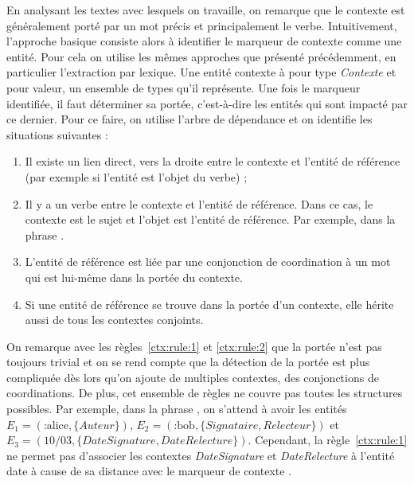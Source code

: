 En analysant les textes avec lesquels on travaille, on remarque que le contexte est généralement porté par un mot précis et principalement le verbe.
Intuitivement, l'approche basique consiste alors à identifier le marqueur de contexte comme une entité.
Pour cela on utilise les mêmes approches que présenté précédemment, en particulier l'extraction par lexique.
Une entité contexte à pour type \emph{Contexte} et pour valeur, un ensemble de types qu'il représente.
Une fois le marqueur identifiée, il faut déterminer sa portée, c'est-à-dire les entités qui sont impacté par ce dernier.
Pour ce faire, on utilise l'arbre de dépendance et on identifie les situations suivantes :
\begin{enumerate}
    \item Il existe un lien direct, vers la droite entre le contexte et l'entité de référence (par exemple si l'entité est l'objet du verbe) ;

    \item Il y a un verbe entre le contexte et l'entité de référence.
          Dans ce cas, le contexte est le sujet et l'objet est l'entité de référence.
          Par exemple, dans la phrase .

    \item L'entité de référence est liée par une conjonction de coordination à un mot qui est lui-même dans la portée du contexte. \label{ctx:rule:1}

    \item Si une entité de référence se trouve dans la portée d'un contexte, elle hérite aussi de tous les contextes conjoints. \label{ctx:rule:2}
\end{enumerate}

On remarque avec les règles~\ref{ctx:rule:1} et \ref{ctx:rule:2} que la portée n'est pas toujours trivial et on se rend compte que la détection de la portée est plus compliquée dès lors qu'on ajoute de multiples contextes, des conjonctions de coordinations.
De plus, cet ensemble de règles ne couvre pas toutes les structures possibles.
Par exemple, dans la phrase , on s'attend à avoir les entités $E_1 = (\text{:alice}, \{Auteur\})$, $E_2 = (\text{:bob}, \{Signataire, Relecteur\})$ et $E_3 = (10/03, \{DateSignature, DateRelecture\})$.
Cependant, la règle~\ref{ctx:rule:1} ne permet pas d'associer les contextes \emph{DateSignature} et \emph{DateRelecture} à l'entité date à cause de sa distance avec le marqueur de contexte .

